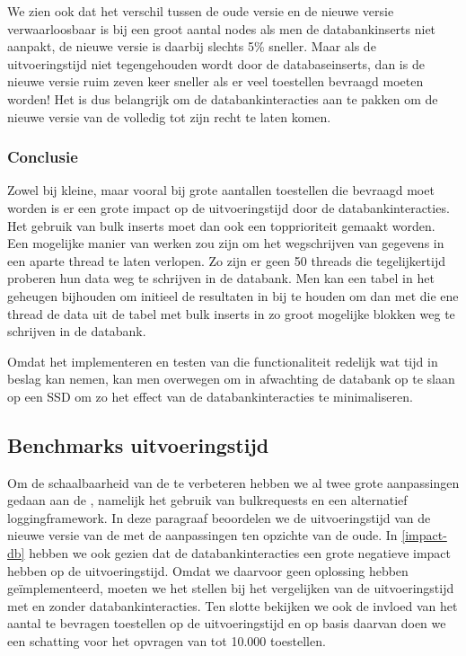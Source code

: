 We zien ook dat het verschil tussen de oude versie en de nieuwe versie verwaarloosbaar is bij een groot aantal nodes als men de databankinserts niet aanpakt,
de nieuwe versie is daarbij slechts 5\% sneller.
Maar als de uitvoeringstijd niet tegengehouden wordt door de databaseinserts,
dan is de nieuwe versie ruim zeven keer sneller als er veel toestellen bevraagd moeten worden!
Het is dus belangrijk om de databankinteracties aan te pakken om de nieuwe versie van de \nwmretriever{} volledig tot zijn recht te laten komen.

\subsubsection{Conclusie}

Zowel bij kleine, maar vooral bij grote aantallen toestellen die bevraagd moet worden is er een grote impact op de uitvoeringstijd door de databankinteracties.
Het gebruik van bulk inserts moet dan ook een topprioriteit gemaakt worden.
Een mogelijke manier van werken zou zijn om het wegschrijven van gegevens in een aparte thread te laten verlopen.
Zo zijn er geen 50 threads die tegelijkertijd proberen hun data weg te schrijven in de databank.
Men kan een tabel in het geheugen bijhouden om initieel de resultaten in bij te houden om dan met die ene thread
de data uit de tabel met bulk inserts in zo groot mogelijke blokken weg te schrijven in de databank.

Omdat het implementeren en testen van die functionaliteit redelijk wat tijd in beslag kan nemen,
kan men overwegen om in afwachting de databank op te slaan op een SSD om zo het effect van de databankinteracties te minimaliseren.


\subsection{Benchmarks uitvoeringstijd}
\label{uitvoeringstijd-vwall}

Om de schaalbaarheid van de \nwmretriever{} te verbeteren hebben we al twee grote aanpassingen gedaan aan de \nwmretriever{},
namelijk het gebruik van bulkrequests en een alternatief loggingframework.
In deze paragraaf beoordelen we de uitvoeringstijd van de nieuwe versie van de \nwmretriever{} met de aanpassingen ten opzichte van de oude.
In \cref{impact-db} hebben we ook gezien dat de databankinteracties een grote negatieve impact hebben op de uitvoeringstijd.
Omdat we daarvoor geen oplossing hebben geïmplementeerd, moeten we het stellen bij het vergelijken van de uitvoeringstijd met en zonder databankinteracties.
Ten slotte bekijken we ook de invloed van het aantal te bevragen toestellen op de uitvoeringstijd en op basis daarvan
doen we een schatting voor het opvragen van tot 10.000 toestellen.

